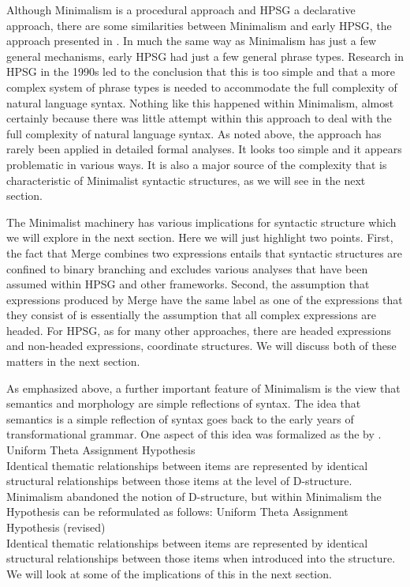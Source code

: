 \documentclass[output=paper]{langsci/langscibook}
\begin{document}
Although Minimalism is a procedural approach and HPSG a declarative approach, there are some similarities between Minimalism and early HPSG, the approach presented in \citet{ps,ps2}. In much the same way as Minimalism has just a few general mechanisms, early HPSG had just a few general phrase types. Research in HPSG in the 1990s led to the conclusion that this is too simple and that a more complex system of phrase types is needed to accommodate the full complexity of natural language syntax. Nothing like this happened within Minimalism, almost certainly because there was little attempt within this approach to deal with the full complexity of natural language syntax. As noted above, the approach has rarely been applied in detailed formal analyses. It looks too simple and it appears problematic in various ways. It is also a major source of the complexity that is characteristic of Minimalist syntactic structures, as we will see in the next section.

The Minimalist machinery has various implications for syntactic structure which we will explore in the next section. Here we will just highlight two points. First, the fact that Merge combines two expressions entails that syntactic structures are confined to binary branching and excludes various analyses that have been assumed within HPSG and other frameworks. Second, the assumption that expressions produced by Merge have the same label as one of the expressions that they consist of is essentially the assumption that all complex expressions are headed. For HPSG, as for many other approaches, there are headed expressions and non-headed expressions, \eg coordinate structures. We will discuss both of these matters in the next section.

As emphasized above, a further important feature of Minimalism is the view that semantics and morphology are simple reflections of syntax. The idea that semantics is a simple reflection of syntax goes back to the early years of transformational grammar. One aspect of this idea was formalized as the  by \citet[46]{Baker88a}.
\eanoraggedright\label{ex:min-UTAH}
Uniform Theta Assignment Hypothesis\\
Identical thematic relationships between items are represented by identical structural relationships between those items at the level of D-structure.
\z
Minimalism abandoned the notion of D-structure, but within Minimalism the Hypothesis can be reformulated as follows:
\eanoraggedright\label{ex:min-UTAH-revised}
Uniform Theta Assignment Hypothesis (revised)\\
Identical thematic relationships between items are represented by identical structural relationships between those items when introduced into the structure.
\z
We will look at some of the implications of this in the next section.
\end{document}
